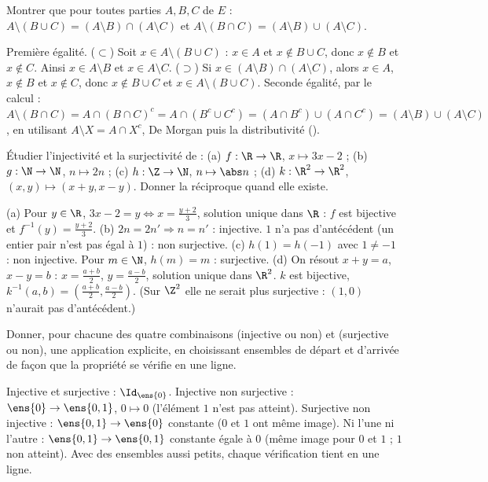 \begin{exo}
Montrer que pour toutes parties $A,B,C$ de $E$ : $A\setminus(B\cup C)=(A\setminus B)\cap(A\setminus C)$ et $A\setminus(B\cap C)=(A\setminus B)\cup(A\setminus C)$.
\begin{corrige}
Première égalité. ($\subset$) Soit $x\in A\setminus(B\cup C)$ : $x\in A$ et $x\notin B\cup C$, donc $x\notin B$ et $x\notin C$. Ainsi $x\in A\setminus B$ et $x\in A\setminus C$. ($\supset$) Si $x\in(A\setminus B)\cap(A\setminus C)$, alors $x\in A$, $x\notin B$ et $x\notin C$, donc $x\notin B\cup C$ et $x\in A\setminus(B\cup C)$.
Seconde égalité, par le calcul : $A\setminus(B\cap C)=A\cap(B\cap C)^c=A\cap(B^c\cup C^c)=(A\cap B^c)\cup(A\cap C^c)=(A\setminus B)\cup(A\setminus C)$, en utilisant $A\setminus X=A\cap X^c$, De Morgan puis la distributivité ().
\end{corrige}
\end{exo}
\begin{exo}
Étudier l'injectivité et la surjectivité de : (a) $f:\R\to\R$, $x\mapsto 3x-2$ ; (b) $g:\N\to\N$, $n\mapsto 2n$ ; (c) $h:\Z\to\N$, $n\mapsto\abs n$ ; (d) $k:\R^2\to\R^2$, $(x,y)\mapsto(x+y,x-y)$. Donner la réciproque quand elle existe.
\begin{corrige}
(a) Pour $y\in\R$, $3x-2=y\iff x=\frac{y+2}3$, solution unique dans $\R$ : $f$ est bijective et $f^{-1}(y)=\frac{y+2}3$.
(b) $2n=2n'\Rightarrow n=n'$ : injective. $1$ n'a pas d'antécédent (un entier pair n'est pas égal à $1$) : non surjective.
(c) $h(1)=h(-1)$ avec $1\neq-1$ : non injective. Pour $m\in\N$, $h(m)=m$ : surjective.
(d) On résout $x+y=a$, $x-y=b$ : $x=\frac{a+b}2$, $y=\frac{a-b}2$, solution unique dans $\R^2$. $k$ est bijective, $k^{-1}(a,b)=\left(\frac{a+b}2,\frac{a-b}2\right)$. (Sur $\Z^2$ elle ne serait plus surjective : $(1,0)$ n'aurait pas d'antécédent.)
\end{corrige}
\end{exo}
\begin{exo}
Donner, pour chacune des quatre combinaisons (injective ou non) et (surjective ou non), une application explicite, en choisissant ensembles de départ et d'arrivée de façon que la propriété se vérifie en une ligne.
\begin{corrige}
Injective et surjective : $\Id_{\ens{0}}$. Injective non surjective : $\ens{0}\to\ens{0,1}$, $0\mapsto0$ (l'élément $1$ n'est pas atteint). Surjective non injective : $\ens{0,1}\to\ens{0}$ constante ($0$ et $1$ ont même image). Ni l'une ni l'autre : $\ens{0,1}\to\ens{0,1}$ constante égale à $0$ (même image pour $0$ et $1$ ; $1$ non atteint). Avec des ensembles aussi petits, chaque vérification tient en une ligne.
\end{corrige}
\end{exo}
